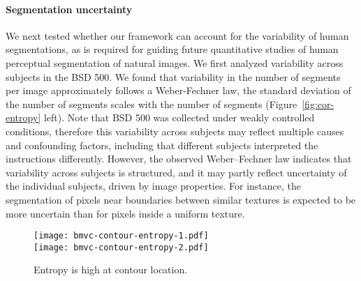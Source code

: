 \documentclass[a4paper,12pt]{article}
\begin{document}
\paragraph{Segmentation uncertainty} We next tested whether our framework can account for the variability of human segmentations, as is required for guiding future quantitative studies of human perceptual segmentation of natural images. We first analyzed variability across subjects in the BSD 500. We found that variability in the number of segments per image approximately follows a Weber-Fechner law, \ie the standard deviation of the number of segments scales with the number of segments (Figure~\ref{fig:cor-entropy} left). Note that BSD 500 was collected under weakly controlled conditions, therefore this variability across subjects may reflect multiple causes and confounding factors, including that different subjects interpreted the instructions differently. However, the observed Weber--Fechner law indicates that variability across subjects is structured, and it may partly reflect uncertainty of the individual subjects, driven by image properties. For instance, the segmentation of pixels near boundaries between similar textures is expected to be more uncertain than for pixels inside a uniform texture. 
%
%
\begin{wrapfigure}{r}{0.5\textwidth}
\begin{center}
\texttt{[image: bmvc-contour-entropy-1.pdf]}\\
\texttt{[image: bmvc-contour-entropy-2.pdf]}
\end{center}
\vspace{-5mm}
\caption{Entropy is high at contour location.}
\label{fig:entropy}
\end{wrapfigure}
%
\end{document}
